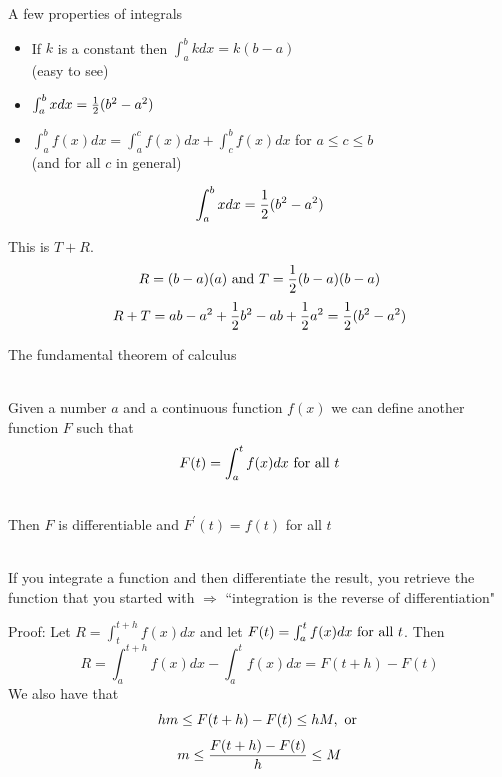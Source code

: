 \documentclass[10pt]{seminar}
\begin{document}
\begin{slide}
   \begin{center}
  \end{center}
  
  
  \newslide
  
  A few properties of integrals
    \vspace{.3in}
  \begin{itemize}
  \item If $k$ is a constant then $\int_a^b k dx = k(b-a)$ \\(easy to see)
  \vspace{.3in}
  \item $\int_a^b x dx = {1\over 2}(b^2-a^2)$
  \vspace{.3in}
    \item $\int_a^b f(x) dx =\int_a^c f(x) dx + \int_c^b f(x) dx$ for $a\leq c\leq b$ \\(and for all $c$ in general)
  \end{itemize}
 

\newslide

 $$\int_a^b x dx = {1\over 2}(b^2-a^2)$$
 
    \begin{center}
  \end{center}
 
 This is $T+R$. $$R=(b-a)(a) \hbox{ and }T={1\over 2}(b-a)(b-a)$$
 $$R+T=ab-a^2+{1\over 2}b^2-ab+{1\over 2}a^2 = {1\over 2}(b^2-a^2)$$
 
 \newslide
 
The fundamental theorem of calculus
 
 \ \\Given a number $a$ and a continuous function $f(x)$ we can define another function $F$ such that $$F(t)=\int_a^t f(x) dx \hbox{ for all } t$$
 
 \ \\Then $F$ is differentiable and $F^\prime(t)=f(t)$ for all $t$
 
 \ \\If you integrate a function and then differentiate the result, you retrieve the function that you started with  $\Rightarrow$ ``integration is the reverse of differentiation"
 
 \newslide
     \begin{center}
  \end{center}
 
 Proof: Let $R=\int_t^{t+h}f(x) dx$ and let $F(t)=\int_a^t f(x) dx \hbox{ for all } t$.  Then $$R=\int_a^{t+h}f(x)dx-\int_a^{t}f(x)dx=F(t+h)-F(t)$$ We also have that $$ hm\leq F(t+h)-F(t)\leq hM, \hbox{ or }$$
$$m\leq {{F(t+h)-F(t)}\over{h}}\leq M$$ 
 

\end{slide}
\end{document}

